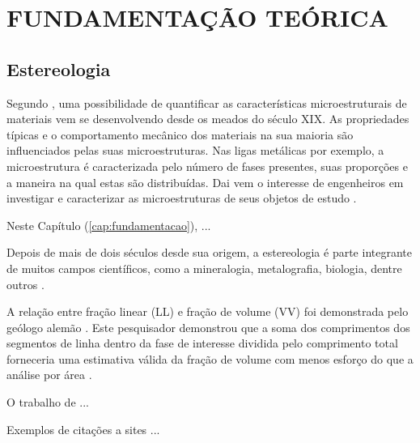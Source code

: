 \chapter{FUNDAMENTAÇÃO TEÓRICA}
\label{cap:fundamentacao}


\section{Estereologia} 

Segundo , uma possibilidade de quantificar as características microestruturais de materiais vem se desenvolvendo desde os meados do século XIX. As propriedades típicas e o comportamento mecânico dos materiais na sua maioria são influenciados pelas suas microestruturas. Nas ligas metálicas por exemplo, a microestrutura é caracterizada pelo número de fases presentes, suas proporções e a maneira na qual estas são distribuídas. Dai vem o interesse de engenheiros em investigar e caracterizar as microestruturas de seus objetos de estudo \cite{Callister2012}.

Neste Capítulo (\autoref{cap:fundamentacao}), ...

\lipsum[6] %

Depois de mais de dois séculos desde sua origem, a estereologia é parte integrante de muitos campos científicos, como a mineralogia, metalografia, biologia, dentre outros \cite{Miyamoto1994, Russ1986, Friel2000, Baddeley2004, Mannheimer2002}.

 A relação entre fração linear (\gls{LL}) e fração de volume (\gls{VV}) foi demonstrada pelo geólogo alemão . Este pesquisador demonstrou que a soma dos comprimentos dos segmentos de linha dentro da fase de interesse dividida pelo comprimento total forneceria uma estimativa válida da fração de volume com menos esforço do que a análise por área \cite{Pabst2015, Baddeley2004,Friel2000, Russ1986}.
 
\lipsum[6] %
 
O trabalho de ...

Exemplos de citações a sites \cite{Benjamin2014, Plugins2018}...